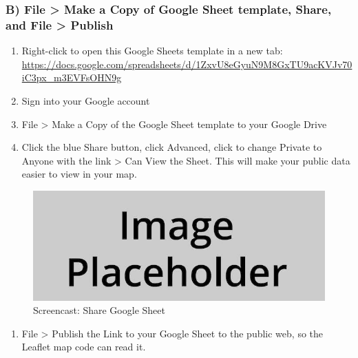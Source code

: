 \documentclass[
  english,
]{book}
\providecommand{\tightlist}{%
  \setlength{\itemsep}{0pt}\setlength{\parskip}{0pt}}
\begin{document}
\hypertarget{b-file-make-a-copy-of-google-sheet-template-share-and-file-publish}{%
\subsubsection*{B) File \textgreater{} Make a Copy of Google Sheet template, Share, and File \textgreater{} Publish}\label{b-file-make-a-copy-of-google-sheet-template-share-and-file-publish}}

\begin{enumerate}
\def\labelenumi{\arabic{enumi})}
\item
  Right-click to open this Google Sheets template in a new tab: \url{https://docs.google.com/spreadsheets/d/1ZxvU8eGyuN9M8GxTU9acKVJv70iC3px_m3EVFsOHN9g}
\item
  Sign into your Google account
\item
  File \textgreater{} Make a Copy of the Google Sheet template to your Google Drive
\item
  Click the blue Share button, click Advanced, click to change Private to Anyone with the link \textgreater{} Can View the Sheet. This will make your public data easier to view in your map.
\end{enumerate}

\begin{figure}
\centering
\includegraphics{images/placeholder.jpg}
\caption{\label{fig:lmwgs-2}Screencast: Share Google Sheet}
\end{figure}

\begin{enumerate}
\def\labelenumi{\arabic{enumi})}
\setcounter{enumi}{4}
\tightlist
\item
  File \textgreater{} Publish the Link to your Google Sheet to the public web, so the Leaflet map code can read it.
\end{enumerate}
\end{document}
